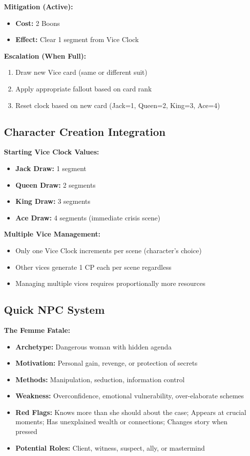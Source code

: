 \documentclass[11pt]{article}
\begin{document}
\textbf{Mitigation (Active):}
\begin{itemize}
    \item \textbf{Cost:} 2 Boons
    \item \textbf{Effect:} Clear 1 segment from Vice Clock
\end{itemize}

\textbf{Escalation (When Full):}
\begin{enumerate}
    \item Draw new Vice card (same or different suit)
    \item Apply appropriate fallout based on card rank
    \item Reset clock based on new card (Jack=1, Queen=2, King=3, Ace=4)
\end{enumerate}

\subsection{Character Creation Integration}

\textbf{Starting Vice Clock Values:}
\begin{itemize}
    \item \textbf{Jack Draw:} 1 segment
    \item \textbf{Queen Draw:} 2 segments
    \item \textbf{King Draw:} 3 segments  
    \item \textbf{Ace Draw:} 4 segments (immediate crisis scene)
\end{itemize}

\textbf{Multiple Vice Management:}
\begin{itemize}
    \item Only one Vice Clock increments per scene (character's choice)
    \item Other vices generate 1 CP each per scene regardless
    \item Managing multiple vices requires proportionally more resources
\end{itemize}

\subsection{Quick NPC System}

\textbf{The Femme Fatale:}
\begin{itemize}
    \item \textbf{Archetype:} Dangerous woman with hidden agenda
    \item \textbf{Motivation:} Personal gain, revenge, or protection of secrets
    \item \textbf{Methods:} Manipulation, seduction, information control
    \item \textbf{Weakness:} Overconfidence, emotional vulnerability, over-elaborate schemes
    \item \textbf{Red Flags:} Knows more than she should about the case; Appears at crucial moments; Has unexplained wealth or connections; Changes story when pressed
    \item \textbf{Potential Roles:} Client, witness, suspect, ally, or mastermind
\end{itemize}
\end{document}
